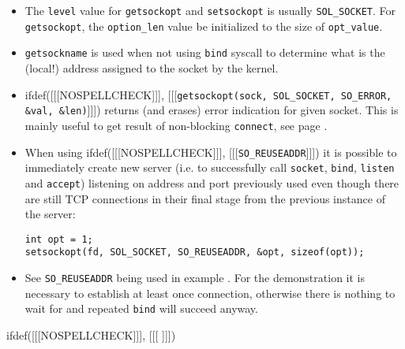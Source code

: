\begin{itemize}
\item The \texttt{level} value for \texttt{getsockopt} and \texttt{setsockopt}
is usually \verb#SOL_SOCKET#. For \texttt{get\-sock\-opt},
the \texttt{option\_len} value  be initialized to
the size of \texttt{opt\_value}.
\item \texttt{getsockname} is used when not using \texttt{bind} syscall
to determine what is the (local!) address assigned to the socket by the kernel.
\item ifdef([[[NOSPELLCHECK]]],
[[[\verb#getsockopt(sock, SOL_SOCKET, SO_ERROR, &val, &len)#]]]) returns
(and erases) error indication for given socket. This is mainly useful to
get result of non-blocking \texttt{connect}, see page \pageref{CONNECT}.
\item When using ifdef([[[NOSPELLCHECK]]], [[[\verb#SO_REUSEADDR#]]]) it is
possible to immediately create new server (i.e. to successfully call
\texttt{socket},
\texttt{bind}, \texttt{listen} and \texttt{accept}) listening on address and
port previously used even though there are still TCP connections in their final
stage from the previous instance of the server:

\begin{verbatim}
int opt = 1;
setsockopt(fd, SOL_SOCKET, SO_REUSEADDR, &opt, sizeof(opt));
\end{verbatim}

\item See \verb#SO_REUSEADDR# being used in example .
For the demonstration it is necessary to establish at least once connection,
otherwise there is nothing to wait for and repeated \texttt{bind} will succeed
anyway.
\end{itemize}


ifdef([[[NOSPELLCHECK]]], [[[
]]])

